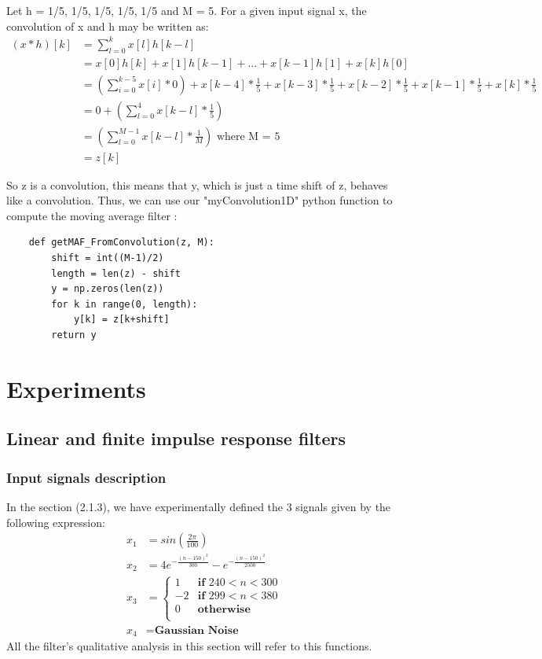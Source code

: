 \documentclass[a4paper,10pt]{article}
\begin{document}
Let h = {1/5, 1/5, 1/5, 1/5, 1/5} and M = 5.  For a given input signal x, the convolution of x and h may be written as:
\begin{equation*}
	\begin{aligned}
	    (x * h)[k]
	        &= \sum_{l=0}^{k} x[l] h[k-l] \\
	        &= x[0] h[k] + x[1] h[k-1] + ... + x[k-1] h[1] + x[k] h[0]\\
	        &= (\sum_{i=0}^{k-5} x[i]*0) + x[k-4] * \frac{1}{5} + x[k-3] * \frac{1}{5} + x[k-2] * \frac{1}{5} + x[k-1] * \frac{1}{5} + x[k] * \frac{1}{5}\\
	        &= 0 + (\sum_{l=0}^{4} x[k-l] * \frac{1}{5})\\
	        &= (\sum_{l=0}^{M-1} x[k-l] * \frac{1}{M}) \mbox{ where M = 5}\\
	        &= z[k]
	\end{aligned}
	\end{equation*}

	So z is a convolution, this means that y, which is just a time shift of z, behaves like a convolution.  Thus, we can use our "myConvolution1D" python function to compute the moving average filter : \newline
	
	
	\begin{lstlisting}
	def getMAF_FromConvolution(z, M):
	    shift = int((M-1)/2)
	    length = len(z) - shift
	    y = np.zeros(len(z))
	    for k in range(0, length):
		    y[k] = z[k+shift]
	    return y
	\end{lstlisting}

\section{Experiments}
    \subsection{Linear and finite impulse response filters}
	\subsubsection{Input signals description}
	In the section (2.1.3), we have experimentally defined the 3 signals given by the following expression:
	\begin{equation}
	\begin{aligned}
	    x_1 &= sin\left(\frac{2 \pi}{100}\right)\\
	    x_2 &= 4e^{-\frac{(n-150)^2}{300}} - e^{-\frac{(n-150)^2}{2500}}\\
	    x_3 &= 
		\begin{cases}
			1 & \textbf{if } 240 < n < 300 \\
		-2 & \textbf{if } 299 < n < 380 \\
		0 & \textbf{otherwise}\\
		\end{cases}\\
	x_4 &= \textbf{Gaussian Noise}
	\end{aligned}
	\end{equation}\label{signalsFormula}
	All the filter's qualitative analysis in this section will refer to this functions.
\end{document}
